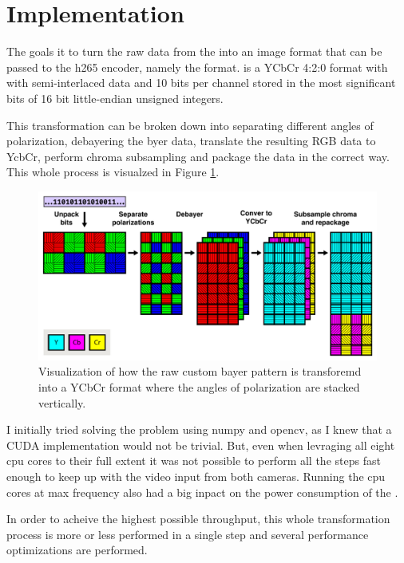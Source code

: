 \section{Implementation}

The goals it to turn the raw data from the \cams into an image format that can be passed to the \gls{h265} encoder, namely the  format.
 is a YCbCr 4:2:0 format with with semi-interlaced data and 10 bits per channel stored in the most significant bits of 16 bit little-endian unsigned integers.

This transformation can be broken down into separating different angles of polarization, debayering the byer data, translate the resulting RGB data to YcbCr, perform chroma subsampling and package the data in the correct way.
This whole process is visualzed in Figure \ref{fig:transform}.

\begin{figure}[H]
    \centering
    \includegraphics[width=\textwidth]{figures/polarized_image/transform.pdf}
    \caption{Visualization of how the raw custom bayer pattern is transforemd into a YCbCr format where the angles of polarization are stacked vertically.}
    \label{fig:transform}
\end{figure}

I initially tried solving the problem using \gls{numpy} and \gls{opencv}, as I knew that a CUDA implementation would not be trivial.
But, even when levraging all eight \gls{cpu} cores to their full extent it was not possible to perform all the steps fast enough to keep up with the video input from both cameras.
Running the \gls{cpu} cores at max frequency also had a big inpact on the power consumption of the \jx.



In order to acheive the highest possible throughput, this whole transformation process is more or less performed in a single step and several performance optimizations are performed.










